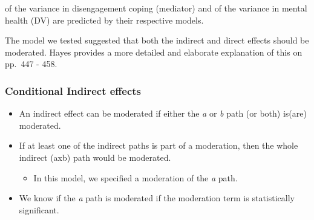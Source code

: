 \documentclass[
  11pt,
]{book}
\providecommand{\tightlist}{%
  \setlength{\itemsep}{0pt}\setlength{\parskip}{0pt}}
\begin{document}
of the variance in disengagement coping (mediator) and of the variance in mental health (DV) are predicted by their respective models.

The model we tested suggested that both the indirect and direct effects should be moderated. Hayes provides a more detailed and elaborate explanation of this on pp.~447 - 458.

\hypertarget{conditional-indirect-effects}{%
\subsubsection{Conditional Indirect effects}\label{conditional-indirect-effects}}

\begin{itemize}
\tightlist
\item
  An indirect effect can be moderated if either the \emph{a} or \emph{b} path (or both) is(are) moderated.
\item
  If at least one of the indirect paths is part of a moderation, then the whole indirect (axb) path would be moderated.

  \begin{itemize}
  \tightlist
  \item
    In this model, we specified a moderation of the \emph{a} path.
  \end{itemize}
\item
  We know if the \emph{a} path is moderated if the moderation term is statistically significant.


\end{itemize}
\end{document}
